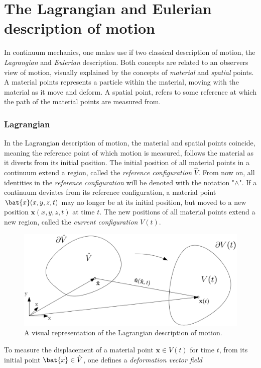 \section{The Lagrangian and Eulerian description of motion}
In continuum mechanics, one makes use if two classical description of motion, the \textit{Lagrangian} and \textit{Eulerian} description. Both concepts are related to an observers view of motion, visually explained by the concepts of \textit{material} and \textit{spatial} points. A material points represents a particle within the material, moving with the material as it move and deform. A spatial point, refers to some reference at which the path of the material points are measured from. 

\subsubsection*{Lagrangian}
In the Lagrangian description of motion, the material and spatial points coincide, meaning the reference point of which motion is measured, follows the material as it diverts from its initial position. The initial position of all material points in a continuum extend a region, called the \textit{reference configuration} $\hat{V}$. From now on, all identities in the \textit{reference configuration} will be denoted with the notation "$\wedge$". If a continuum deviates from its reference configuration, a material point $\bat{x}(x, y, z ,t)$ may no longer be at its initial position, but moved to a new position $\mathbf{x}(x, y, z, t)$ at time $t$.  The new positions of all material points extend a new region, called the \textit{current configuration} $V(t)$. 
\begin{figure}[h!]
  \centering
    \includegraphics[scale=0.4]{./Fig/lagframe.png}
      \caption{A visual representation of the Lagrangian description of motion.}
\end{figure}
\newpage
To measure the displacement of a material point $\mathbf{x} \in V(t)$ for time $t$, from its initial point $\bat{x} \in \hat{V}$, one defines a \textit{deformation vector field} 
